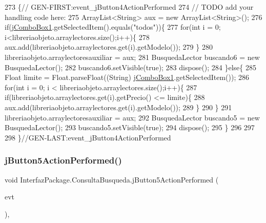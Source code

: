 \begin{DoxyCode}
273                                                                          \{\textcolor{comment}{//
      GEN-FIRST:event\_jButton4ActionPerformed}
274         \textcolor{comment}{// TODO add your handling code here:}
275         ArrayList<String> aux = \textcolor{keyword}{new} ArrayList<String>();
276         \textcolor{keywordflow}{if}(\mbox{\hyperlink{class_interfaz_package_1_1_consulta_busqueda_ab0737507a855f158ca16439d3df67b4e}{jComboBox1}}.getSelectedItem().equals(\textcolor{stringliteral}{"todos"}))\{
277             \textcolor{keywordflow}{for}(\textcolor{keywordtype}{int} i = 0; i<libreriaobjeto.arraylectores.size();i++)\{
278             aux.add(libreriaobjeto.arraylectores.get(i).getModelo());
279             \}
280             libreriaobjeto.arraylectoresauxiliar = aux;
281             BusquedaLector buscando6 = \textcolor{keyword}{new} BusquedaLector();
282             buscando6.setVisible(\textcolor{keyword}{true});
283             dispose();
284         \}\textcolor{keywordflow}{else}\{
285             Float limite = Float.parseFloat((String) \mbox{\hyperlink{class_interfaz_package_1_1_consulta_busqueda_ab0737507a855f158ca16439d3df67b4e}{jComboBox1}}.getSelectedItem());
286             \textcolor{keywordflow}{for}(\textcolor{keywordtype}{int} i = 0; i < libreriaobjeto.arraylectores.size();i++)\{
287                 \textcolor{keywordflow}{if}(libreriaobjeto.arraylectores.get(i).getPrecio() <= limite)\{
288                     aux.add(libreriaobjeto.arraylectores.get(i).getModelo());
289                 \}
290             \}
291             libreriaobjeto.arraylectoresauxiliar = aux;
292             BusquedaLector buscando5 = \textcolor{keyword}{new} BusquedaLector();
293             buscando5.setVisible(\textcolor{keyword}{true});
294             dispose();
295         \}
296         
297         
298     \}\textcolor{comment}{//GEN-LAST:event\_jButton4ActionPerformed}
\end{DoxyCode}
\mbox{\label{class_interfaz_package_1_1_consulta_busqueda_a005ad36a62a45a951e73f6d37f28c883}} 
\subsubsection{\texorpdfstring{j\+Button5\+Action\+Performed()}{jButton5ActionPerformed()}}
{\footnotesize\ttfamily void Interfaz\+Package.\+Consulta\+Busqueda.\+j\+Button5\+Action\+Performed (\begin{DoxyParamCaption}\item[{java.\+awt.\+event.\+Action\+Event}]{evt }\end{DoxyParamCaption})\hspace{0.3cm}{\ttfamily [inline]}, {\ttfamily [private]}}


